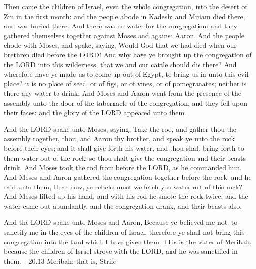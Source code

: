  Then came the children of Israel, even the whole
congregation, into the desert of Zin in the first month: and the people
abode in Kadesh; and Miriam died there, and was buried there.
 And there was no water for the congregation: and they
gathered themselves together against Moses and against Aaron.
 And the people chode with Moses, and spake, saying, Would
God that we had died when our brethren died before the LORD!
 And why have ye brought up the congregation of the LORD
into this wilderness, that we and our cattle should die there?
 And wherefore have ye made us to come up out of Egypt, to
bring us in unto this evil place? it is no place of seed, or of figs, or
of vines, or of pomegranates; neither is there any water to drink.
 And Moses and Aaron went from the presence of the assembly
unto the door of the tabernacle of the congregation, and they fell upon
their faces: and the glory of the LORD appeared unto them.

 And the LORD spake unto Moses, saying,  Take
the rod, and gather thou the assembly together, thou, and Aaron thy
brother, and speak ye unto the rock before their eyes; and it shall give
forth his water, and thou shalt bring forth to them water out of the
rock: so thou shalt give the congregation and their beasts drink.
 And Moses took the rod from before the LORD, as he
commanded him.  And Moses and Aaron gathered the
congregation together before the rock, and he said unto them, Hear now,
ye rebels; must we fetch you water out of this rock?  And
Moses lifted up his hand, and with his rod he smote the rock twice: and
the water came out abundantly, and the congregation drank, and their
beasts also.

 And the LORD spake unto Moses and Aaron, Because ye
believed me not, to sanctify me in the eyes of the children of Israel,
therefore ye shall not bring this congregation into the land which I
have given them.  This is the water of Meribah; because the
children of Israel strove with the LORD, and he was sanctified in them.+
20.13 Meribah: that is, Strife

